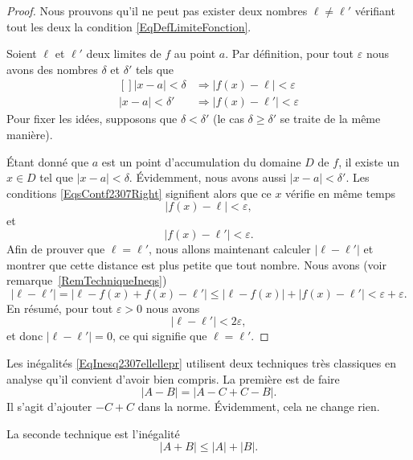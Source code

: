 \begin{proof}
    Nous prouvons qu'il ne peut pas exister deux nombres $\ell\neq\ell'$ vérifiant tout les deux la condition \eqref{EqDefLimiteFonction}.

	Soient $\ell$ et $\ell'$ deux limites de $f$ au point $a$. Par définition, pour tout $\varepsilon$ nous avons des nombres $\delta$ et $\delta'$ tels que
	\begin{equation}	\label{EqsContf2307Right}
		\begin{aligned}[]
			| x-a |<\delta&\Rightarrow \big| f(x)-\ell \big|<\varepsilon\\
			| x-a |<\delta'&\Rightarrow \big| f(x)-\ell' \big|<\varepsilon
		\end{aligned}
	\end{equation}
	Pour fixer les idées, supposons que $\delta<\delta'$ (le cas $\delta\geq\delta'$ se traite de la même manière).

	Étant donné que $a$ est un point d'accumulation du domaine $D$ de $f$, il existe un $x\in D$ tel que $| x-a |<\delta$. Évidemment, nous avons aussi $| x-a |<\delta'$. Les conditions \eqref{EqsContf2307Right} signifient alors que ce $x$ vérifie en même temps
	\begin{equation}
		| f(x)-\ell |<\varepsilon,
	\end{equation}
	et
	\begin{equation}
		| f(x)-\ell' |<\varepsilon.
	\end{equation}
	Afin de prouver que $\ell=\ell'$, nous allons maintenant calculer $| \ell-\ell' |$ et montrer que cette distance est plus petite que tout nombre. Nous avons (voir remarque~\ref{RemTechniqueIneqs})
	\begin{equation}	\label{EqInesq2307ellellepr}
		| \ell-\ell' |=| \ell-f(x)+f(x)-\ell' |\leq | \ell-f(x) |+| f(x)-\ell' |<\varepsilon+\varepsilon.
	\end{equation}
	En résumé, pour tout $\varepsilon>0$ nous avons
	\begin{equation}
		| \ell-\ell' |<2\varepsilon,
	\end{equation}
	et donc $| \ell-\ell' |=0$, ce qui signifie que $\ell=\ell'$.
\end{proof}

\begin{remark}		\label{RemTechniqueIneqs}
	Les inégalités \eqref{EqInesq2307ellellepr} utilisent deux techniques très classiques en analyse qu'il convient d'avoir bien compris. La première est de faire
	\begin{equation}
		| A-B |=| A-C+C-B |.
	\end{equation}
	Il s'agit d'ajouter $-C+C$ dans la norme. Évidemment, cela ne change rien.

	La seconde technique est l'inégalité
	\begin{equation}
		| A+B |\leq| A |+| B |.
	\end{equation}
\end{remark}

